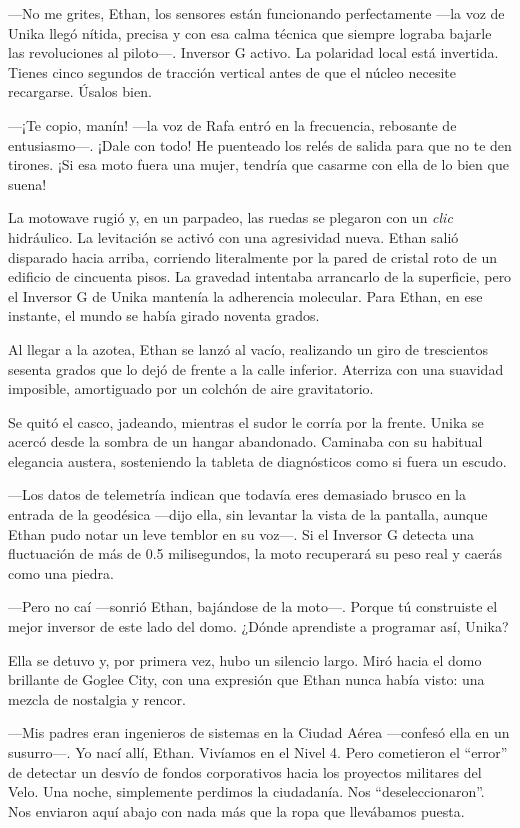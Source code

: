 \documentclass[12pt,a4paper]{book}
\begin{document}
---No me grites, Ethan, los sensores están funcionando perfectamente ---la voz de Unika llegó nítida, precisa y con esa calma técnica que siempre lograba bajarle las revoluciones al piloto---. Inversor G activo. La polaridad local está invertida. Tienes cinco segundos de tracción vertical antes de que el núcleo necesite recargarse. Úsalos bien.

---¡Te copio, manín! ---la voz de Rafa entró en la frecuencia, rebosante de entusiasmo---. ¡Dale con todo! He puenteado los relés de salida para que no te den tirones. ¡Si esa moto fuera una mujer, tendría que casarme con ella de lo bien que suena!

La motowave rugió y, en un parpadeo, las ruedas se plegaron con un \textit{clic} hidráulico. La levitación se activó con una agresividad nueva. Ethan salió disparado hacia arriba, corriendo literalmente por la pared de cristal roto de un edificio de cincuenta pisos. La gravedad intentaba arrancarlo de la superficie, pero el Inversor G de Unika mantenía la adherencia molecular. Para Ethan, en ese instante, el mundo se había girado noventa grados.

Al llegar a la azotea, Ethan se lanzó al vacío, realizando un giro de trescientos sesenta grados que lo dejó de frente a la calle inferior. Aterriza con una suavidad imposible, amortiguado por un colchón de aire gravitatorio.

Se quitó el casco, jadeando, mientras el sudor le corría por la frente. Unika se acercó desde la sombra de un hangar abandonado. Caminaba con su habitual elegancia austera, sosteniendo la tableta de diagnósticos como si fuera un escudo.

---Los datos de telemetría indican que todavía eres demasiado brusco en la entrada de la geodésica ---dijo ella, sin levantar la vista de la pantalla, aunque Ethan pudo notar un leve temblor en su voz---. Si el Inversor G detecta una fluctuación de más de 0.5 milisegundos, la moto recuperará su peso real y caerás como una piedra.

---Pero no caí ---sonrió Ethan, bajándose de la moto---. Porque tú construiste el mejor inversor de este lado del domo. ¿Dónde aprendiste a programar así, Unika?

Ella se detuvo y, por primera vez, hubo un silencio largo. Miró hacia el domo brillante de Goglee City, con una expresión que Ethan nunca había visto: una mezcla de nostalgia y rencor.

---Mis padres eran ingenieros de sistemas en la Ciudad Aérea ---confesó ella en un susurro---. Yo nací allí, Ethan. Vivíamos en el Nivel 4. Pero cometieron el ``error'' de detectar un desvío de fondos corporativos hacia los proyectos militares del Velo. Una noche, simplemente perdimos la ciudadanía. Nos ``deseleccionaron''. Nos enviaron aquí abajo con nada más que la ropa que llevábamos puesta.
\end{document}
